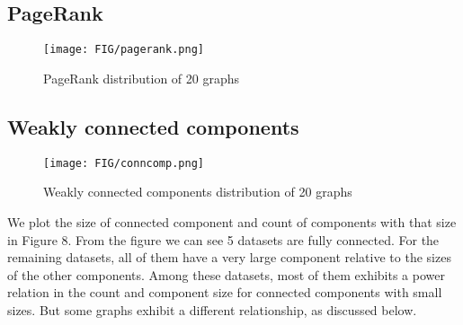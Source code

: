 \subsection{PageRank}
\begin{figure}[H]
\begin{center}
\texttt{[image: FIG/pagerank.png]}
\caption{PageRank distribution of 20 graphs}
\end{center}
\end{figure}



\subsection{Weakly connected components}
\begin{figure}[H]
\begin{center}
\texttt{[image: FIG/conncomp.png]}
\caption{Weakly connected components distribution of 20 graphs}
\end{center}
\end{figure}

We plot the size of connected component and count of components with that size in Figure 8. From the figure we can see 5 datasets are fully connected. For the remaining datasets, all of them have a very large component relative to the sizes of the other components. Among these datasets, most of them exhibits a power relation in the count and component size for connected components with small sizes. But some graphs exhibit a different relationship, as discussed below.

